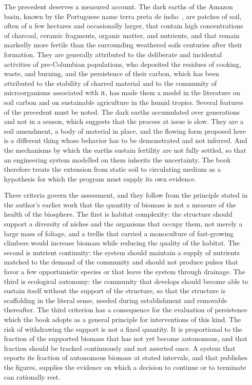 The precedent deserves a measured account. The dark earths of the Amazon basin, known by the Portuguese name terra preta de \'indio~\cite{glaser2001}, are patches of soil, often of a few hectares and occasionally larger, that contain high concentrations of charcoal, ceramic fragments, organic matter, and nutrients, and that remain markedly more fertile than the surrounding weathered soils centuries after their formation. They are generally attributed to the deliberate and incidental activities of pre-Columbian populations, who deposited the residues of cooking, waste, and burning, and the persistence of their carbon, which has been attributed to the stability of charred material and to the community of microorganisms associated with it, has made them a model in the literature on soil carbon and on sustainable agriculture in the humid tropics. Several features of the precedent must be noted. The dark earths accumulated over generations and not in a season, which suggests that the process at issue is slow. They are a soil amendment, a body of material in place, and the flowing form proposed here is a different thing whose behavior has to be demonstrated and not inferred. And the mechanisms by which the earths sustain fertility are not fully settled, so that an engineering system modelled on them inherits the uncertainty. The book therefore treats the extension from static soil to circulating medium as a hypothesis for which the program must supply its own evidence.

Three criteria govern the assessment, and they follow from the principle stated in the author's earlier work that the quantity of biomass is not a measure of the health of the biosphere. The first is habitat complexity: the structure should support a diversity of niches and the organisms that occupy them, not merely a large mass of foliage, and a trellis that carried a monoculture of fast-growing climbers would increase biomass while reducing the quality of the habitat. The second is nutrient continuity: the system should maintain a supply of nutrients matched to the demand of the community and should not produce pulses that favor a few opportunistic species or that leave the system through drainage. The third is ecological autonomy: the community that develops should become able to sustain itself without the support of the structure, so that the structure is scaffolding in the literal sense, needed during establishment and removable thereafter. The third criterion has a consequence for the evaluation of persistence which the book adopts as a general principle for interventions of this kind. The risk of withdrawing the support is not a fixed quantity. It is proportional to the fraction of the supported biomass that has not yet become autonomous, and that fraction should be tracked continuously and not asserted once. A system that reports its fraction of autonomous biomass at stated intervals, and that publishes the figures, supplies the evidence on which a decision to continue or to terminate can rationally rest.

